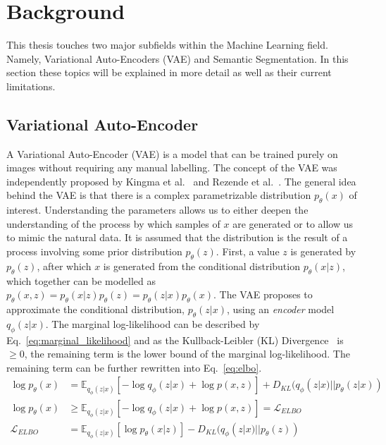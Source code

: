 \chapter{Background}\label{chapter:background}
This thesis touches two major subfields within the Machine Learning field. Namely, Variational Auto-Encoders (VAE) and Semantic Segmentation. In this section these topics will be explained in more detail as well as their current limitations.

\section{Variational Auto-Encoder}\label{sec:vae}
A Variational Auto-Encoder (VAE) is a model that can be trained purely on images without requiring any manual labelling. The concept of the VAE was independently proposed by Kingma et al.~\cite{kingma2014autoencodingvariationalbayes} and Rezende et al.~\cite{rezende2014stochastic}. The general idea behind the VAE is that there is a complex parametrizable distribution $p_\theta(x)$ of interest. Understanding the parameters allows us to either deepen the understanding of the process by which samples of $x$ are generated or to allow us to mimic the natural data. It is assumed that the distribution is the result of a process involving some prior distribution $p_\theta(z)$. First, a value $z$ is generated by $p_\theta(z)$, after which $x$ is generated from the conditional distribution $p_\theta(x | z)$, which together can be modelled as $p_\theta(x, z) = p_\theta(x|z)p_\theta(z) = p_\theta(z|x)p_\theta(x)$. The VAE proposes to approximate the conditional distribution, $p_\theta(z|x)$, using an \emph{encoder} model $q_\phi(z|x)$. The marginal log-likelihood can be described by Eq.~\ref{eq:marginal_likelihood} and as the Kullback-Leibler (KL) Divergence~\cite{kullback1951information} is $\geq 0$, the remaining term is the lower bound of the marginal log-likelihood. The remaining term can be further rewritten into Eq.~\ref{eq:elbo}.
\begin{subequations}
    \begin{align}
        \log p_\theta(x)   & = \mathbb{E}_{q_{\phi}(z|x)}[-\log q_\phi(z|x) + \log p(x,z)] + D_{KL}(q_{\phi}(z|x) || p_\theta(z|x))\label{eq:marginal_likelihood} \\
        \log p_\theta(x)   & \geq \mathbb{E}_{q_{\phi}(z|x)}[-\log q_\phi(z|x) + \log p(x,z)] = \mathcal{L}_{ELBO}                                                \\
        \mathcal{L}_{ELBO} & = \mathbb{E}_{q_{\phi}(z|x)}[\log p_\theta(x|z)] - D_{KL}(q_{\phi}(z|x) || p_\theta(z))\label{eq:elbo}
    \end{align}
\end{subequations}
